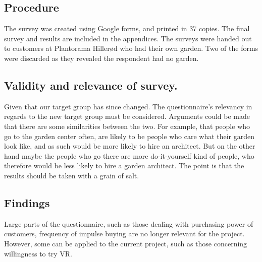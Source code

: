 	\subsection{Procedure}
	The survey was created using Google forms, and printed in 37 copies. The final survey and results are included in the appendices. The surveys were handed out to customers at Plantorama Hillerød who had their own garden. Two of the forms were discarded as they revealed the respondent had no garden.
			
	\subsection{Validity and relevance of survey.}
	Given that our target group has since changed. The questionnaire's relevancy in regards to the new target group must be considered. Arguments could be made that there are some similarities between the two. For example, that people who go to the garden center often, are likely to be people who care what their garden look like, and as such would be more likely to hire an architect. But on the other hand maybe the people who go there are more do-it-yourself kind of people, who therefore would be less likely to hire a garden architect. The point is that the results should be taken with a grain of salt.
	
	\subsection{Findings}
		Large parts of the questionnaire, such as those dealing with purchasing power of customers, frequency of impulse buying are no longer relevant for the project. However, some can be applied to the current project, such as those concerning willingness to try VR. 
		
